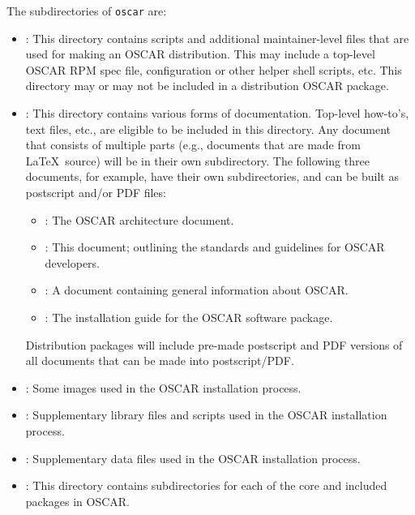 \noindent The subdirectories of {\tt oscar} are:

\begin{itemize}
  
\item {}: This directory contains scripts and additional
  maintainer-level files that are used for making an OSCAR
  distribution.  This may include a top-level OSCAR RPM spec file,
  configuration or other helper shell scripts, etc.  This directory
  may or may not be included in a distribution OSCAR package.
  
\item {}: This directory contains various forms of
  documentation.  Top-level how-to's, text files, etc., are eligible
  to be included in this directory.  Any document that consists of
  multiple parts (e.g., documents that are made from \LaTeX\ source)
  will be in their own subdirectory.  The following three documents,
  for example, have their own subdirectories, and can be built as
  postscript and/or PDF files:

  \begin{itemize}
  \item {}: The OSCAR architecture document.

  \item {}: This document; outlining the standards and
    guidelines for OSCAR developers.

  \item {}: A document containing general information
    about OSCAR.
    
  \item {}: The installation guide for the OSCAR
    software package.
  \end{itemize}
  
  Distribution packages will include pre-made postscript and PDF
  versions of all documents that can be made into postscript/PDF.

\item {}: Some images used in the OSCAR installation
  process.

\item {}: Supplementary library files and scripts used in the
  OSCAR installation process.

\item {}: Supplementary data files used in the OSCAR
  installation process.

\item {}: This directory contains subdirectories for each
  of the core and included packages in OSCAR.
  

\end{itemize}

